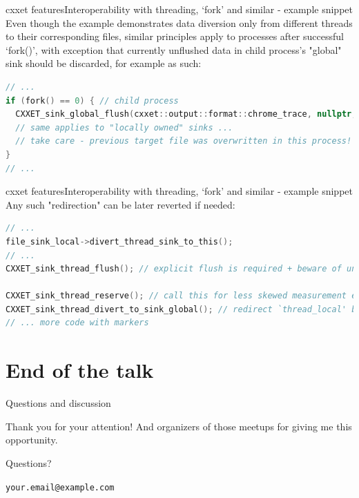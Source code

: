 \documentclass[aspectratio=169]{beamer}
\begin{document}
\begin{frame}[fragile]{cxxet features}{Interoperability with threading, `fork' and similar - example snippet}
    Even though the example demonstrates data diversion only from different threads to their corresponding files, similar principles apply to processes after successful `fork()', with exception that currently unflushed data in child process's "global" sink should be discarded, for example as such:

    \begin{lstlisting}[language=C++]
// ...
if (fork() == 0) { // child process
  CXXET_sink_global_flush(cxxet::output::format::chrome_trace, nullptr, false); // `false' - don't defer the flush
  // same applies to "locally owned" sinks ...
  // take care - previous target file was overwritten in this process!
}
// ...
    \end{lstlisting}

\end{frame}

\begin{frame}[fragile]{cxxet features}{Interoperability with threading, `fork' and similar - example snippet}
    Any such "redirection" can be later reverted if needed:

    \begin{lstlisting}[language=C++]
// ...
file_sink_local->divert_thread_sink_to_this();
// ...
CXXET_sink_thread_flush(); // explicit flush is required + beware of unterminated markers in current scope!

CXXET_sink_thread_reserve(); // call this for less skewed measurement explicitly
CXXET_sink_thread_divert_to_sink_global(); // redirect `thread_local' buffer back to the global one
// ... more code with markers
    \end{lstlisting}

\end{frame}



\section{End of the talk}

\begin{frame}{Questions and discussion}
    \begin{center}
        \Large Thank you for your attention! And organizers of those meetups for giving me this opportunity.

        \vspace{1cm}

        Questions?

        \vspace{1cm}

        \texttt{your.email@example.com}

    \end{center}

\end{frame}
\end{document}
